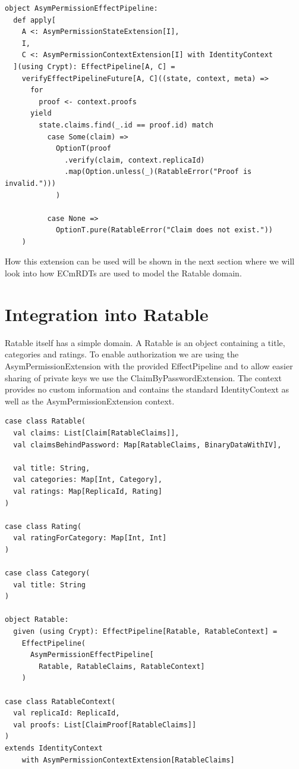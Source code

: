 \documentclass[
	ngerman,
	ruledheaders=section,   %
	class=report,		    %
	thesis={type=bachelor}, %
	accentcolor=9c,			%
	custommargins=true,    %
	marginpar=false,        %
	parskip=half-,          %
	fontsize=11pt,          %
]{tudapub}
\begin{document}
\begin{lstlisting}
object AsymPermissionEffectPipeline:
  def apply[
    A <: AsymPermissionStateExtension[I], 
    I, 
    C <: AsymPermissionContextExtension[I] with IdentityContext
  ](using Crypt): EffectPipeline[A, C] =
    verifyEffectPipelineFuture[A, C]((state, context, meta) =>
      for
        proof <- context.proofs
      yield
        state.claims.find(_.id == proof.id) match
          case Some(claim) => 
            OptionT(proof
              .verify(claim, context.replicaId)
              .map(Option.unless(_)(RatableError("Proof is invalid.")))
            )

          case None => 
            OptionT.pure(RatableError("Claim does not exist."))
    )
\end{lstlisting}

How this extension can be used will be shown in the next section where we will look into how ECmRDTs are used to model the Ratable domain.

\section{Integration into Ratable}
Ratable itself has a simple domain. A Ratable is an object containing a title, categories and ratings. To enable authorization we are using the AsymPermissionExtension with the provided EffectPipeline and to allow easier sharing of private keys we use the ClaimByPasswordExtension. The context provides no custom information and contains the standard IdentityContext as well as the AsymPermissionExtension context.

\begin{lstlisting}
case class Ratable(
  val claims: List[Claim[RatableClaims]],
  val claimsBehindPassword: Map[RatableClaims, BinaryDataWithIV],

  val title: String,
  val categories: Map[Int, Category],
  val ratings: Map[ReplicaId, Rating]
)

case class Rating(
  val ratingForCategory: Map[Int, Int]
)

case class Category(
  val title: String
)

object Ratable:
  given (using Crypt): EffectPipeline[Ratable, RatableContext] = 
    EffectPipeline(
      AsymPermissionEffectPipeline[
        Ratable, RatableClaims, RatableContext]
    )

case class RatableContext(
  val replicaId: ReplicaId,
  val proofs: List[ClaimProof[RatableClaims]]
) 
extends IdentityContext 
    with AsymPermissionContextExtension[RatableClaims]
\end{lstlisting}
\end{document}
